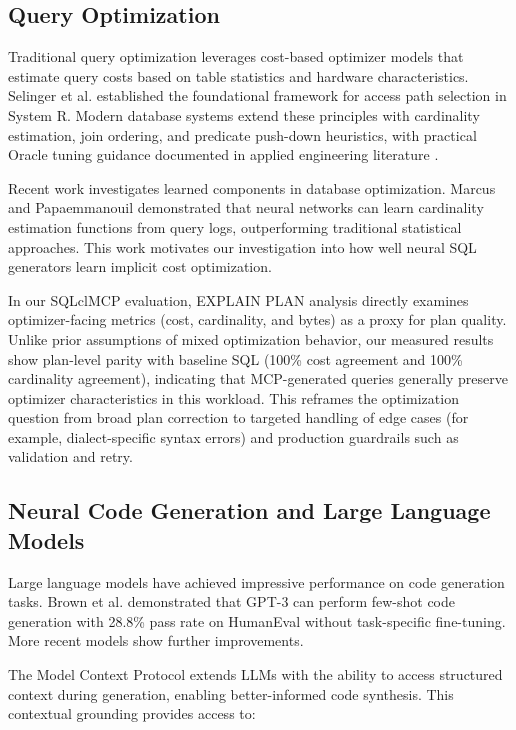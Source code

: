 \subsection{Query Optimization}

Traditional query optimization leverages cost-based optimizer models that estimate query costs based on table statistics and hardware characteristics. Selinger et al. \cite{selinger1979access} established the foundational framework for access path selection in System R. Modern database systems extend these principles with cardinality estimation, join ordering, and predicate push-down heuristics, with practical Oracle tuning guidance documented in applied engineering literature \cite{mishra2025oracletuning}.

Recent work investigates learned components in database optimization. Marcus and Papaemmanouil \cite{marcus2019learned} demonstrated that neural networks can learn cardinality estimation functions from query logs, outperforming traditional statistical approaches. This work motivates our investigation into how well neural SQL generators learn implicit cost optimization.

In our SQLclMCP evaluation, EXPLAIN PLAN analysis directly examines optimizer-facing metrics (cost, cardinality, and bytes) as a proxy for plan quality. Unlike prior assumptions of mixed optimization behavior, our measured results show plan-level parity with baseline SQL (100\% cost agreement and 100\% cardinality agreement), indicating that MCP-generated queries generally preserve optimizer characteristics in this workload. This reframes the optimization question from broad plan correction to targeted handling of edge cases (for example, dialect-specific syntax errors) and production guardrails such as validation and retry.

\subsection{Neural Code Generation and Large Language Models}

Large language models have achieved impressive performance on code generation tasks. Brown et al. \cite{brown2020language} demonstrated that GPT-3 can perform few-shot code generation with 28.8\% pass rate on HumanEval without task-specific fine-tuning. More recent models show further improvements.

The Model Context Protocol \cite{anthropic2024mcp} extends LLMs with the ability to access structured context during generation, enabling better-informed code synthesis. This contextual grounding provides access to:

